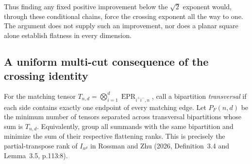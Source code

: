 Thus finding any fixed positive improvement below the
$\sqrt2$ exponent would, through these conditional chains,
force the crossing exponent all the way to one. The argument
does not supply such an improvement, nor does a planar square
alone establish flatness in every dimension.

\subsection{A uniform multi-cut consequence of the crossing identity}

For the matching tensor
$T_{n,d}=\bigotimes_{i=1}^d\operatorname{EPR}_{i^+i^-,n}$,
call a bipartition \emph{transversal} if each side contains exactly one
endpoint of every matching edge. Let $P_F(n,d)$ be the minimum number
of tensors separated across transversal bipartitions whose sum is
$T_{n,d}$. Equivalently, group all summands with the same bipartition
and minimize the sum of their respective flattening ranks. This is
precisely the partial-transpose rank of $I_{n^d}$ in Rossman and Zhu
(2026, Definition~3.4 and Lemma~3.5, p.113:8).

